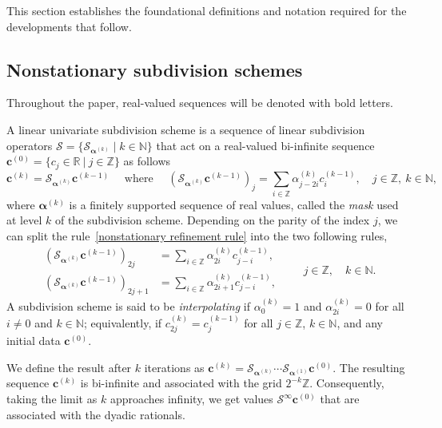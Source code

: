\documentclass[11pt,a4paper]{article}
\newcommand{\N}{\mathbb{N}}
\theoremstyle{definition}
\begin{document}
This section establishes the foundational definitions and notation required for the developments that follow.

\subsection{Nonstationary subdivision schemes}\label{sec:subdivision_schemes}



Throughout the paper, real-valued sequences will be denoted with bold letters.

A linear univariate subdivision scheme is a sequence of linear subdivision operators $\boldsymbol{\mathcal{S}}=\{\mathcal{S}_{\boldsymbol{\alpha}^{(k)}} \mid   k\in \N \}$ that act on a real-valued bi-infinite sequence $\boldsymbol{c}^{(0)}=\{c_j \in \mathbb{R} \ | \ j \in \mathbb{Z} \}$ as follows
\begin{equation}\label{nonstationary refinement rule}
    \boldsymbol{c}^{(k)} = \mathcal{S}_{\boldsymbol{\alpha}^{(k)}}\boldsymbol{c}^{(k-1)} \quad \text{ where } \quad (\mathcal{S}_{\boldsymbol{\alpha}^{(k)}}\boldsymbol{c}^{(k-1)})_j = \sum_{i \in \mathbb{Z}} \alpha_{j-2i}^{(k)}c_i^{(k-1)}, \quad j \in \mathbb{Z}, \  k \in \N, 
\end{equation}
where $\boldsymbol{\alpha}^{(k)}$ is a finitely supported sequence of real values, called the \emph{mask} used at level $k$ of the subdivision scheme. 
Depending on the parity of the index $j$, we can split the rule~\eqref{nonstationary refinement rule} into the two following rules,
\begin{equation}\label{eqn:two_rules}
\begin{split}
    (\mathcal{S}_{\boldsymbol{\alpha}^{(k)}}\boldsymbol{c}^{(k-1)})_{2j} & =\sum_{i \in \mathbb{Z}} \alpha^{(k)}_{2i}c^{(k-1)}_{j-i}, \\
    (\mathcal{S}_{\boldsymbol{\alpha}^{(k)}}\boldsymbol{c}^{(k-1)})_{2j+1} & =\sum_{i \in \mathbb{Z}} \alpha^{(k)}_{2i+1}c^{(k-1)}_{j-i},
\end{split}
    \qquad j \in \mathbb{Z}, \quad k \in \N.
\end{equation}
A subdivision scheme is said to be \emph{interpolating} if $\alpha^{(k)}_{0}=1$ and $\alpha^{(k)}_{2i}=0$ for all $i\neq0$ and $k\in\N$; equivalently, if $c^{(k)}_{2j}=c^{(k-1)}_{j}$ for all $j\in\mathbb{Z}$, $k \in \N$, and any initial data $\boldsymbol{c}^{(0)}$. 

We define the result after 
$k$ iterations as $ \boldsymbol{c}^{(k)}= \mathcal{S}_{\boldsymbol{\alpha}^{(k)}} \cdots \mathcal{S}_{\boldsymbol{\alpha}^{(1)}} \boldsymbol{c}^{(0)}$. The resulting sequence $\boldsymbol{c}^{(k)}$ is bi-infinite and associated with the grid $2^{-k}\mathbb{Z}$. Consequently, taking the limit as $k$ approaches infinity, we get values $\boldsymbol{\mathcal{S}}^{\infty}\boldsymbol{c}^{(0)}$ that are associated with the dyadic rationals.
\end{document}
